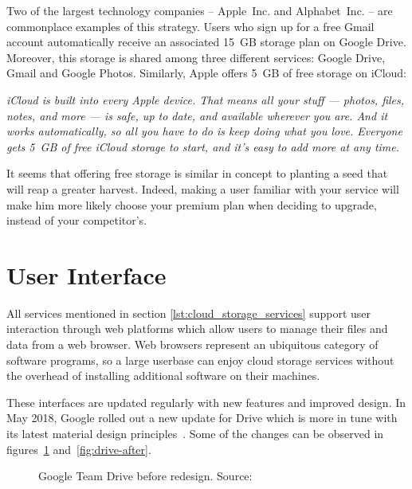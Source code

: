 Two of the largest technology companies -- \mbox{Apple Inc.} and \mbox{Alphabet Inc.} -- are commonplace examples of this strategy. Users who sign up for a free Gmail account automatically receive an associated \mbox{15 GB} storage plan on Google Drive. Moreover, this storage is shared among three different services: Google Drive, Gmail and Google Photos. Similarly, Apple offers \mbox{5 GB} of free storage on iCloud:

\begin{quoting}[vskip=0pt]
\emph{iCloud is built into every Apple device. That means all your stuff — photos, files, notes, and more — is safe, up to date, and available wherever you are. And it works automatically, so all you have to do is keep doing what you love. Everyone gets \mbox{5 GB} of free iCloud storage to start, and it’s easy to add more at any time.}~\cite{icloud_website}
\end{quoting}

It seems that offering free storage is similar in concept to planting a seed that will reap a greater harvest. Indeed, making a user familiar with your service will make him more likely choose your premium plan when deciding to upgrade, instead of your competitor's.

\section{User Interface}

All services mentioned in section \ref{lst:cloud_storage_services} support user interaction through web platforms which allow users to manage their files and data from a web browser. Web browsers represent an ubiquitous category of software programs, so a large userbase can enjoy cloud storage services without the overhead of installing additional software on their machines.

These interfaces are updated regularly with new features and improved design. In May 2018, Google rolled out a new update for Drive which is more in tune with its latest material design principles~\cite{google_drive_ui_updates,how_google_created_a_custom_material_theme}. Some of the changes can be observed in figures~\ref{fig:drive-before} and~\ref{fig:drive-after}.

\begin{figure}[bpt]
\caption{Google Team Drive before redesign. Source:~\cite{google_drive_ui_updates}}
\label{fig:drive-before}
\centering
{}
\end{figure}

